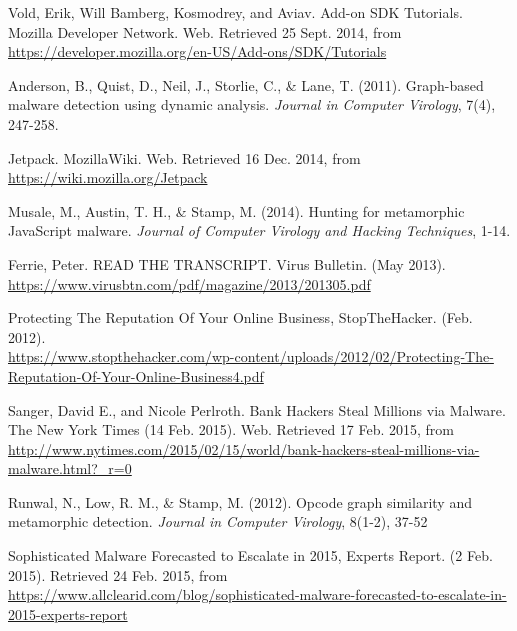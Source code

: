 %
%
%
%
\begin{thebibliography}{10}

 Vold, Erik, Will Bamberg, Kosmodrey, and Aviav. Add-on SDK Tutorials. Mozilla Developer Network. Web. Retrieved 25 Sept. 2014, from \\
\url{https://developer.mozilla.org/en-US/Add-ons/SDK/Tutorials}

 Anderson, B., Quist, D., Neil, J., Storlie, C., \& Lane, T. (2011). Graph-based malware detection using dynamic analysis. {\it Journal in Computer Virology}, 7(4), 247-258.

 Jetpack. MozillaWiki. Web. Retrieved 16 Dec. 2014, from \\ 
\url{https://wiki.mozilla.org/Jetpack}

 Musale, M., Austin, T. H., \& Stamp, M. (2014). Hunting for metamorphic JavaScript malware. {\it Journal of Computer Virology and Hacking Techniques}, 1-14.

 Ferrie, Peter. READ THE TRANSCRIPT. Virus Bulletin. (May 2013). \\
\url{https://www.virusbtn.com/pdf/magazine/2013/201305.pdf}

 Protecting The Reputation Of Your Online Business, StopTheHacker. (Feb. 2012). \\
\url{https://www.stopthehacker.com/wp-content/uploads/2012/02/Protecting-The-Reputation-Of-Your-Online-Business4.pdf}

 Sanger, David E., and Nicole Perlroth. Bank Hackers Steal Millions via Malware. The New York Times (14 Feb. 2015). Web. Retrieved 17 Feb. 2015, from \\
\url{http://www.nytimes.com/2015/02/15/world/bank-hackers-steal-millions-via-malware.html?_r=0}

 Runwal, N., Low, R. M., \& Stamp, M. (2012). Opcode graph similarity and metamorphic detection. {\it Journal in Computer Virology}, 8(1-2), 37-52

 Sophisticated Malware Forecasted to Escalate in 2015, Experts Report. (2 Feb. 2015). Retrieved 24 Feb. 2015, from \\
\url{https://www.allclearid.com/blog/sophisticated-malware-forecasted-to-escalate-in-2015-experts-report}


\end{thebibliography}
